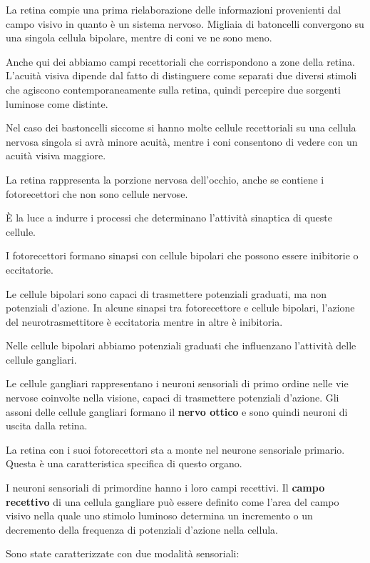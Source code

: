 \documentclass[]{article}
\begin{document}
La retina compie una prima rielaborazione delle informazioni provenienti
dal campo visivo in quanto è un sistema nervoso. Migliaia di batoncelli
convergono su una singola cellula bipolare, mentre di coni ve ne sono
meno.

Anche qui dei abbiamo campi recettoriali che corrispondono a zone della
retina. L'acuità visiva dipende dal fatto di distinguere come separati
due diversi stimoli che agiscono contemporaneamente sulla retina, quindi
percepire due sorgenti luminose come distinte.

Nel caso dei bastoncelli siccome si hanno molte cellule recettoriali su
una cellula nervosa singola si avrà minore acuità, mentre i coni
consentono di vedere con un acuità visiva maggiore.

La retina rappresenta la porzione nervosa dell'occhio, anche se contiene
i fotorecettori che non sono cellule nervose.

È la luce a indurre i processi che determinano l'attività sinaptica di
queste cellule.

I fotorecettori formano sinapsi con cellule bipolari che possono essere
inibitorie o eccitatorie.

Le cellule bipolari sono capaci di trasmettere potenziali graduati, ma
non potenziali d'azione. In alcune sinapsi tra fotorecettore e cellule
bipolari, l'azione del neurotrasmettitore è eccitatoria mentre in altre
è inibitoria.

Nelle cellule bipolari abbiamo potenziali graduati che influenzano
l'attività delle cellule gangliari.

Le cellule gangliari rappresentano i neuroni sensoriali di primo ordine
nelle vie nervose coinvolte nella visione, capaci di trasmettere
potenziali d'azione. Gli assoni delle cellule gangliari formano il
\textbf{nervo ottico} e sono quindi neuroni di uscita dalla retina.

La retina con i suoi fotorecettori sta a monte nel neurone sensoriale
primario. Questa è una caratteristica specifica di questo organo.

I neuroni sensoriali di primordine hanno i loro campi recettivi. Il
\textbf{campo recettivo} di una cellula gangliare può essere definito
come l'area del campo visivo nella quale uno stimolo luminoso determina
un incremento o un decremento della frequenza di potenziali d'azione
nella cellula.

Sono state caratterizzate con due modalità sensoriali:
\end{document}

